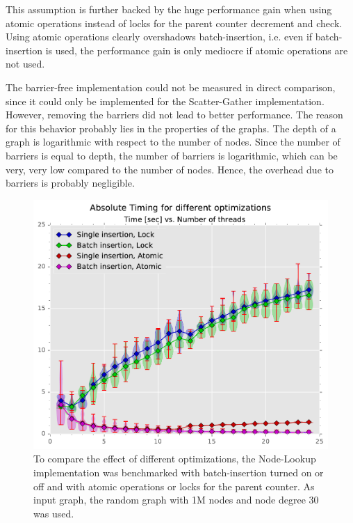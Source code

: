 This assumption is further backed by the huge performance gain when using atomic operations instead of locks for the parent counter decrement and check.
Using atomic operations clearly overshadows batch-insertion, i.e. even if batch-insertion is used, the performance gain is only mediocre if atomic operations are not used.

The barrier-free implementation could not be measured in direct comparison, since it could only be implemented for the Scatter-Gather implementation.
However, removing the barriers did not lead to better performance. The reason for this behavior probably lies in the properties of the graphs.
The depth of a graph is logarithmic with respect to the number of nodes. Since the number of barriers is equal to depth, the number of barriers is logarithmic, which can be very, very low compared to the number of nodes.
Hence, the overhead due to barriers is probably negligible.

\begin{figure}[t]
	\centering
	\includegraphics[width=\columnwidth]{plots/abstiming_gtRANDOMLIN_n1000000_deg30.pdf}
	\caption{To compare the effect of different optimizations, the Node-Lookup implementation was benchmarked with batch-insertion turned on or off and with atomic operations or locks for the parent counter.
	As input graph, the random graph with 1M nodes and node degree 30 was used.}
	\label{fig:abstiming}
\end{figure}


